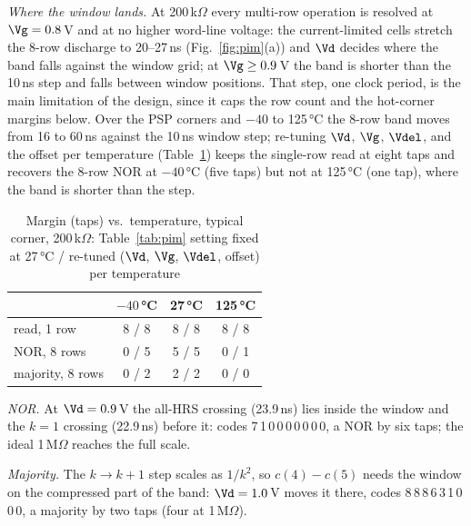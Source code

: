 \textit{Where the window lands.} At 200\,k$\Omega$ every multi-row operation is resolved at
$\Vg=0.8$\,V and at no higher word-line voltage: the current-limited
cells stretch the 8-row discharge to 20--27\,ns (Fig.~\ref{fig:pim}(a)) and $\Vd$ decides where
the band falls against the window grid; at $\Vg\ge0.9$\,V the band is shorter than the 10\,ns step and falls between window positions.
That step, one clock period, is the main limitation of the design, since it caps the row count
and the hot-corner margins below. Over the PSP corners and $-40$ to 125\,\si{\celsius} the 8-row band moves from 16 to
60\,ns against the 10\,ns window step; re-tuning $\Vd$, $\Vg$, $\Vdel$, and the offset per
temperature (Table~\ref{tab:retune}) keeps the single-row read at eight taps and recovers the
8-row NOR at $-40$\,\si{\celsius} (five taps) but not at 125\,\si{\celsius} (one tap), where
the band is shorter than the step.
\begin{table}[!t]
\centering
\caption{Margin (taps) vs.\ temperature, typical corner, 200\,k$\Omega$: Table~\ref{tab:pim} setting fixed at
27\,\si{\celsius} / re-tuned ($\Vd$, $\Vg$, $\Vdel$, offset) per temperature}
\label{tab:retune}
\scriptsize
\setlength{\tabcolsep}{4pt}
\begin{tabular}{@{}lccc@{}}
\toprule
 & $-40$\,\si{\celsius} & 27\,\si{\celsius} & 125\,\si{\celsius}\\
\midrule
read, 1 row & 8 / 8 & 8 / 8 & 8 / 8\\
NOR, 8 rows & 0 / 5 & 5 / 5 & 0 / 1\\
majority, 8 rows & 0 / 2 & 2 / 2 & 0 / 0\\
\bottomrule
\end{tabular}
\end{table}

\textit{NOR.} At $\Vd=0.9$\,V the all-HRS crossing (23.9\,ns) lies inside the window and the
$k=1$ crossing (22.9\,ns) before it: codes 7\,1\,0\,0\,0\,0\,0\,0\,0, a NOR by six taps; the
ideal 1\,M$\Omega$ reaches the full scale.

\textit{Majority.} The $k\to k+1$ step scales as $1/k^2$, so $c(4)-c(5)$ needs the window on the
compressed part of the band: $\Vd=1.0$\,V moves it there, codes 8\,8\,8\,6\,3\,1\,0\,0\,0, a
majority by two taps (four at 1\,M$\Omega$). 

